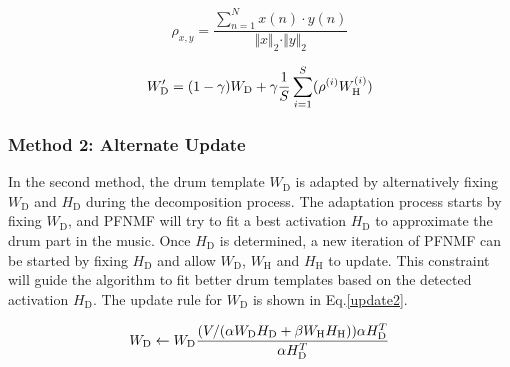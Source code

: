 \documentclass{article}
\begin{document}
\begin{equation}\label{rho}
\rho_{x, y} = \frac{\sum_{n=1}^N x(n)\cdot y(n)}{\Vert x \Vert_2 \cdot \Vert y \Vert_2}
\end{equation}    

\begin{equation}
\label{update1}
W_\mathrm{D}^{\prime} = (1 - \gamma) W_\mathrm{D} + \gamma \frac{1}{S} \sum_{i=1}^S(\rho^{(i)} W_\mathrm{H}^{(i)})\\
\end{equation}


\subsubsection{Method 2: Alternate Update}\label{subsubsec:method2}
In the second method, the drum template $W_\mathrm{D}$ is adapted by alternatively fixing $W_\mathrm{D}$ and $H_\mathrm{D}$ during the decomposition process. The adaptation process starts by fixing $W_\mathrm{D}$, and PFNMF will try to fit a best activation $H_\mathrm{D}$ to approximate the drum part in the music. Once $H_\mathrm{D}$ is determined, a new iteration of PFNMF can be started by fixing $H_\mathrm{D}$ and allow $W_\mathrm{D}$, $W_\mathrm{H}$ and $H_\mathrm{H}$ to update. This constraint will guide the algorithm to fit better drum templates based on the detected activation $H_\mathrm{D}$. The update rule for $W_\mathrm{D}$ is shown in Eq.\eqref{update2}. 

\begin{equation}\label{update2}
W_\mathrm{D} \leftarrow W_\mathrm{D}\frac{(V/(\alpha W_\mathrm{D}H_\mathrm{D} + \beta W_\mathrm{H}H_\mathrm{H})) \alpha H_\mathrm{D}^T}{\alpha H_\mathrm{D}^T}\\
\end{equation}
\end{document}
